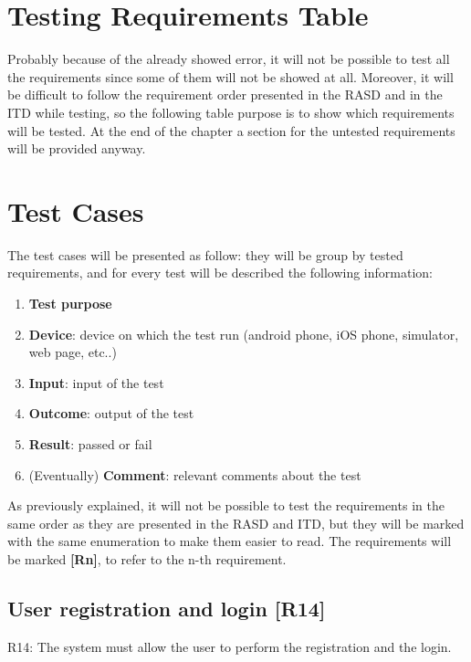 \documentclass[../ATD.tex]{subfiles}
\begin{document}
    \section{Testing Requirements Table}\label{sec:testing-requirements-table}
    Probably because of the already showed error, it will not be possible to test all the requirements since some of them will not be showed at all.
    Moreover, it will be difficult to follow the requirement order presented in the RASD and in the ITD while testing, so the following table purpose is to show which requirements will be tested.
    At the end of the chapter a section for the untested requirements will be provided anyway.


    \section{Test Cases}\label{sec:test-cases}
    The test cases will be presented as follow: they will be group by tested requirements, and for every test will be described the following information:
    \begin{enumerate}
        \item \textbf{Test purpose}
        \item \textbf{Device}: device on which the test run (android phone, iOS phone, simulator, web page, etc..)
        \item \textbf{Input}: input of the test
        \item \textbf{Outcome}: output of the test
        \item \textbf{Result}: passed or fail
        \item (Eventually) \textbf{Comment}: relevant comments about the test
    \end{enumerate}
    As previously explained, it will not be possible to test the requirements in the same order as they are presented in the RASD and ITD,
    but they will be marked with the same enumeration to make them easier to read.
    The requirements will be marked \textbf{[Rn]}, to refer to the n-th requirement.

    \subsection{User registration and login [R14]}\label{subsec:user-registration-and-login}
    R14: The system must allow the user to perform the registration and the login.
\end{document}
